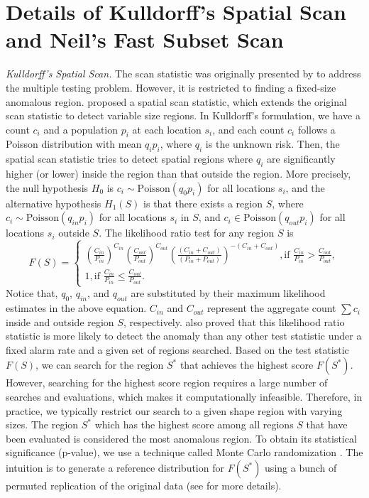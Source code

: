 \documentclass[11pt]{article}
\begin{document}
\section{Details of Kulldorff's Spatial Scan and Neil's Fast Subset Scan}
\textit{Kulldorff's Spatial Scan.}
The scan statistic was originally presented by \citet{naus1965distribution} to address the multiple testing problem. However, it is restricted to finding a fixed-size anomalous region. \citet{kulldorff1995spatial} proposed a spatial scan statistic, which extends the original scan statistic to detect variable size regions. In Kulldorff's formulation, we have a count $c_i$ and a population $p_i$ at each location $s_i$, and each count $c_i$ follows a Poisson distribution with mean $q_ip_i$, where $q_i$ is the unknown risk. Then, the spatial scan statistic tries to detect spatial regions where $q_i$ are significantly higher (or lower) inside the region than that outside the region. More precisely,  the null hypothesis $H_0$ is $c_i\sim \mbox{Poisson}(q_{0}p_i)$ for all locations $s_i$, and the alternative hypothesis $H_1(S)$ is that there exists a region $S$, where $c_i\sim \mbox{Poisson}(q_{in}p_i)$ for all locations $s_i$ in $S$, and $c_i\in \mbox{Poisson}(q_{out}p_i)$ for all locations $s_i$ outside $S$.  The likelihood ratio test for any region $S$ is 
\begin{equation}
	F(S)=
\begin{cases}
    (\frac{C_{in}}{P_{in}})^{C_{in}}(\frac{C_{out}}{P_{out}})^{C_{out}}(\frac{(C_{in}+C_{out})}{(P_{in}+P_{out})})^{-(C_{in}+C_{out})}, \mbox{if } \frac{C_{in}}{P_{in}}>\frac{C_{out}}{P_{out}}, \\
    1, \mbox{if }\frac{C_{in}}{P_{in}}\leq \frac{C_{out}}{P_{out}}.
\end{cases}
\end{equation}
Notice that, $q_{0}$, $q_{in}$, and $q_{out}$ are substituted by their maximum likelihood estimates in the above equation. $C_{in}$ and $C_{out}$ represent the aggregate count $\sum c_i$ inside and outside region $S$, respectively. \citet{kulldorff1997spatial} also proved that this likelihood ratio statistic is more likely to detect the anomaly than any other test statistic under a fixed alarm rate and a given set of regions searched. Based on the test statistic $F(S)$, we can search for the region $S^*$ that achieves the highest score $F(S^*)$. However, searching for the highest score region requires a large number of searches and evaluations, which makes it computationally infeasible. Therefore, in practice, we typically restrict our search to a given shape region with varying sizes. The region $S^*$ which has the highest score among all regions $S$ that have been evaluated is considered the most anomalous region. To obtain its statistical significance (p-value), we use a technique called Monte Carlo randomization \citep{dwass1957modified}. The intuition is to generate a reference distribution for $F(S^*)$ using a bunch of permuted replication of the original data (see \citet{kulldorff2005space} for more details).
\end{document}
